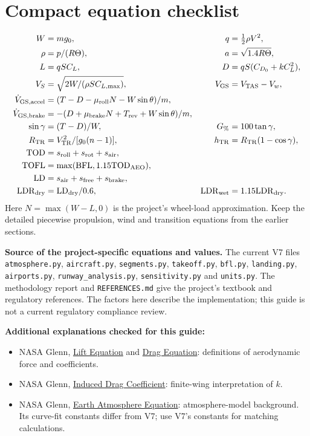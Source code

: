 \documentclass[11pt,letterpaper]{article}
\newcommand{\topic}[1]{\clearpage\section{#1}}
\begin{document}
\topic{Compact equation checklist}
\begin{align*}
W&=mg_0,&q&=\tfrac12\rho V^2,\\
\rho&=p/(R\Theta),&a&=\sqrt{1.4R\Theta},\\
L&=qSC_L,&D&=qS(C_{D_0}+kC_L^2),\\
V_S&=\sqrt{2W/(\rho SC_{L,\max})},&V_{\rm GS}&=V_{\rm TAS}-V_w,\\
\dot V_{\rm GS,accel}&=(T-D-\mu_{\rm roll}N-W\sin\theta)/m,\\
\dot V_{\rm GS,brake}&=-(D+\mu_{\rm brake}N+T_{\rm rev}+W\sin\theta)/m,\\
\sin\gamma&=(T-D)/W,&G_{\%}&=100\tan\gamma,\\
R_{\rm TR}&=V_{\rm TR}^2/[g_0(n-1)],&h_{\rm TR}&=R_{\rm TR}(1-\cos\gamma),\\
\mathrm{TOD}&=s_{\rm roll}+s_{\rm rot}+s_{\rm air},\\
\mathrm{TOFL}&=\max(\mathrm{BFL},1.15\mathrm{TOD}_{\rm AEO}),\\
\mathrm{LD}&=s_{\rm air}+s_{\rm free}+s_{\rm brake},\\
\mathrm{LDR}_{\rm dry}&=\mathrm{LD}_{\rm dry}/0.6,&
\mathrm{LDR}_{\rm wet}&=1.15\mathrm{LDR}_{\rm dry}.
\end{align*}
Here $N=\max(W-L,0)$ is the project's wheel-load approximation. Keep the detailed
piecewise propulsion, wind and transition equations from the earlier sections.

\textbf{Source of the project-specific equations and values.}
The current V7 files \texttt{atmosphere.py}, \texttt{aircraft.py},
\texttt{segments.py}, \texttt{takeoff.py}, \texttt{bfl.py}, \texttt{landing.py},
\texttt{airports.py}, \texttt{runway\_analysis.py}, \texttt{sensitivity.py} and
\texttt{units.py}. The methodology report and \texttt{REFERENCES.md} give the
project's textbook and regulatory references. The factors here describe the
implementation; this guide is not a current regulatory compliance review.

\textbf{Additional explanations checked for this guide:}
\begin{itemize}
\item NASA Glenn, \href{https://www1.grc.nasa.gov/beginners-guide-to-aeronautics/lift-equation-2/}{Lift Equation} and
\href{https://www1.grc.nasa.gov/beginners-guide-to-aeronautics/drag-equation/}{Drag Equation}: definitions of aerodynamic force and coefficients.
\item NASA Glenn, \href{https://www1.grc.nasa.gov/beginners-guide-to-aeronautics/induced-drag-coefficient/}{Induced Drag Coefficient}: finite-wing interpretation of $k$.
\item NASA Glenn, \href{https://www1.grc.nasa.gov/beginners-guide-to-aeronautics/earth-atmosphere-equation-metric/}{Earth Atmosphere Equation}: atmosphere-model background. Its curve-fit constants differ from V7; use V7's constants for matching calculations.
\end{itemize}
\end{document}
